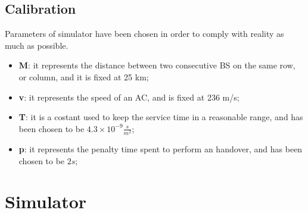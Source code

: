 \documentclass[a4paper,12pt]{article}
\begin{document}
\subsection{Calibration}
\label{sec:calibration}
Parameters of simulator have been chosen in order to comply with reality as much as possible.
\begin{itemize}
  \item \textbf{M}: it represents the distance between two consecutive BS on the same row, or column, and it is fixed at 25 km;
  \item \textbf{v}: it represents the speed of an AC, and is fixed at 236 m/s;
  \item \textbf{T}: it is a costant used to keep the service time in a reasonable range, and has been chosen to be $4.3 \times 10^{-9} \frac{s}{m^2}$;
  \item \textbf{p}: it represents the penalty time spent to perform an handover, and has been chosen to be $2s$;
\end{itemize}



\section{Simulator}
\end{document}
